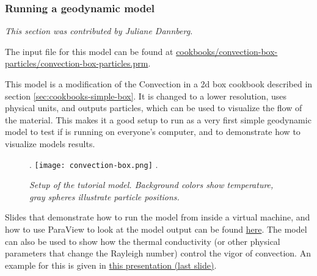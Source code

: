 \subsubsection{Running a geodynamic model}
\label{sec:cookbooks-running-a-model}
\textit{This section was contributed by Juliane Dannberg.}

The input file for this model can be found at \url{cookbooks/convection-box-particles/convection-box-particles.prm}.

This model is a modification of the Convection in a 2d box cookbook described in section \ref{sec:cookbooks-simple-box}. 
It is changed to a lower resolution, uses physical units, and outputs particles, which can be used to visualize the flow 
of the material. 
This makes it a good setup to run as a very first simple geodynamic model to test if \aspect{} is running on everyone's
computer, and to demonstrate how to visualize models results. 

\begin{figure}[h]
\phantom.
\hfill
\texttt{[image: convection-box.png]}
\hfill
\phantom.
\caption{\it Setup of the tutorial model. Background colors show temperature, gray spheres illustrate particle positions.}
\label{fig:convection-box-iterations}
\end{figure}

Slides that demonstrate how to run the model from inside a virtual machine, and how to use ParaView to look at the model
output can be found \href{https://www.dropbox.com/s/dmlcf4tx62ts6d1/02_geophysics_tutorial_01_08.pdf?dl=0}{here}. 
The model can also be used to show how the thermal conductivity (or other physical parameters that change the Rayleigh
number) control the vigor of convection. An example for this is given in \href{https://www.dropbox.com/s/nqkxe54poe1op7d/03_geophysics_lecture_01_10.pdf?dl=0}{this presentation (last slide)}.



